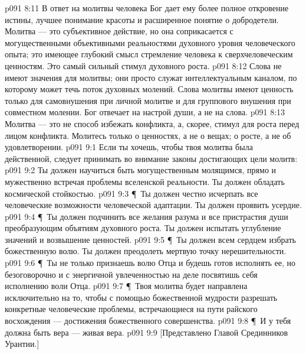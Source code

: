 \vs p091 8:11 В ответ на молитвы человека Бог дает ему более полное откровение истины, лучшее понимание красоты и расширенное понятие о добродетели. Молитва --- это субъективное действие, но она соприкасается с могущественными объективными реальностями духовного уровня человеческого опыта; это имеющее глубокий смысл стремление человека к сверхчеловеческим ценностям. Это самый сильный стимул духовного роста.
\vs p091 8:12 Слова не имеют значения для молитвы; они просто служат интеллектуальным каналом, по которому может течь поток духовных молений. Слова молитвы имеют ценность только для самовнушения при личной молитве и для группового внушения при совместном молении. Бог отвечает на настрой души, а не на слова.
\vs p091 8:13 Молитва --- это не способ избежать конфликта, а, скорее, стимул для роста перед лицом конфликта. Молитесь только о ценностях, а не о вещах; о росте, а не об удовлетворении.
\vs p091 9:1 Если ты хочешь, чтобы твоя молитва была действенной, следует принимать во внимание законы достигающих цели молитв:
\vs p091 9:2 \bibnobreakspace Ты должен научиться быть могущественным молящимся, прямо и мужественно встречая проблемы вселенской реальности. Ты должен обладать космической стойкостью.
\vs p091 9:3 \P\ \bibnobreakspace Ты должен честно исчерпать все человеческие возможности человеческой адаптации. Ты должен проявить усердие.
\vs p091 9:4 \P\ \bibnobreakspace Ты должен подчинить все желания разума и все пристрастия души преобразующим объятиям духовного роста. Ты должен испытать углубление значений и возвышение ценностей.
\vs p091 9:5 \P\ \bibnobreakspace Ты должен всем сердцем избрать божественную волю. Ты должен преодолеть мертвую точку нерешительности.
\vs p091 9:6 \P\ \bibnobreakspace Ты не только признаешь волю Отца и будешь готов исполнять ее, но безоговорочно и с энергичной увлеченностью на деле посвятишь себя исполнению воли Отца.
\vs p091 9:7 \P\ \bibnobreakspace Твоя молитва будет направлена исключительно на то, чтобы с помощью божественной мудрости разрешать конкретные человеческие проблемы, встречающиеся на пути райского восхождения --- достижения божественного совершенства.
\vs p091 9:8 \P\ \bibnobreakspace И у тебя должна быть вера --- живая вера.
\vs p091 9:9 [Представлено Главой Срединников Урантии.]
